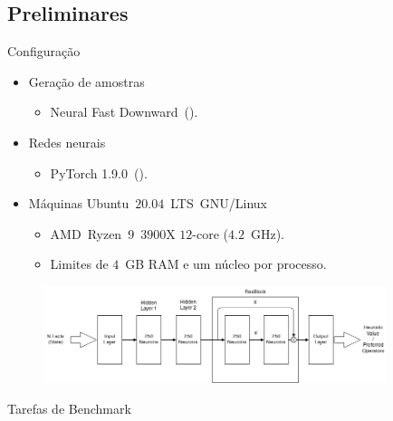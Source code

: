\documentclass{beamer}
\begin{document}
\subsection{Preliminares}
\begin{frame}{Configuração}
\begin{itemize}
  \item Geração de amostras
  \begin{itemize}
    \item Neural Fast Downward~(\cite{Ferber.etal/2020a}).
  \end{itemize}
  \item Redes neurais
  \begin{itemize}
    \item PyTorch 1.9.0~(\cite{Paszke/2019}).
  \end{itemize}
  \item Máquinas Ubuntu~$20.04$~LTS~GNU/Linux
  \begin{itemize}
    \item AMD~Ryzen~$9$~$3900$X $12$-core ($4.2$~GHz).
    \item Limites de $4$~GB RAM e um núcleo por processo.
  \end{itemize}
\end{itemize}
\begin{figure}[tb]
    \centering
    \includegraphics[width=10cm]{img/resnet.png}
\end{figure}

\end{frame}


\begin{frame}{Tarefas de Benchmark}

\end{frame}
\end{document}
